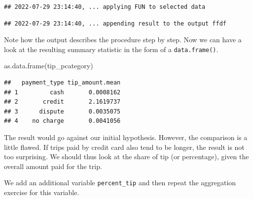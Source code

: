 \documentclass[
  12pt,
]{style/krantz}
\newenvironment{Shaded}{\begin{snugshade}}{\end{snugshade}}
\newcommand{\AttributeTok}[1]{\textcolor[rgb]{0.77,0.63,0.00}{#1}}
\newcommand{\CommentTok}[1]{\textcolor[rgb]{0.56,0.35,0.01}{\textit{#1}}}
\newcommand{\ConstantTok}[1]{\textcolor[rgb]{0.00,0.00,0.00}{#1}}
\newcommand{\ControlFlowTok}[1]{\textcolor[rgb]{0.13,0.29,0.53}{\textbf{#1}}}
\newcommand{\DecValTok}[1]{\textcolor[rgb]{0.00,0.00,0.81}{#1}}
\newcommand{\FunctionTok}[1]{\textcolor[rgb]{0.00,0.00,0.00}{#1}}
\newcommand{\NormalTok}[1]{#1}
\newcommand{\OtherTok}[1]{\textcolor[rgb]{0.56,0.35,0.01}{#1}}
\newcommand{\SpecialCharTok}[1]{\textcolor[rgb]{0.00,0.00,0.00}{#1}}
\begin{document}
\begin{verbatim}
## 2022-07-29 23:14:40, ... applying FUN to selected data
\end{verbatim}

\begin{verbatim}
## 2022-07-29 23:14:40, ... appending result to the output ffdf
\end{verbatim}

Note how the output describes the procedure step by step. Now we can have a look at the resulting summary statistic in the form of a \texttt{data.frame()}.

\begin{Shaded}
\begin{Highlighting}[]
\FunctionTok{as.data.frame}\NormalTok{(tip\_pcategory)}
\end{Highlighting}
\end{Shaded}

\begin{verbatim}
##   payment_type tip_amount.mean
## 1         cash       0.0008162
## 2       credit       2.1619737
## 3      dispute       0.0035075
## 4    no charge       0.0041056
\end{verbatim}

The result would go against our initial hypothesis. However, the comparison is a little flawed. If trips paid by credit card also tend to be longer, the result is not too surprising. We should thus look at the share of tip (or percentage), given the overall amount paid for the trip.

We add an additional variable \texttt{percent\_tip} and then repeat the aggregation exercise for this variable.

\begin{Shaded}
\end{Shaded}
\end{document}
